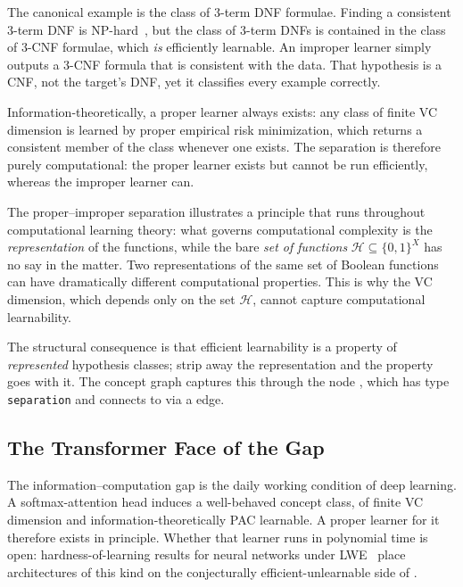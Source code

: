 The canonical example is the class of $3$-term DNF formulae.  Finding a
consistent $3$-term DNF is $\mathrm{NP}$-hard~\cite{PittValiant1988}, but the
class of $3$-term DNFs is contained in the class of $3$-CNF formulae, which
\emph{is} efficiently learnable.  An improper learner simply outputs a $3$-CNF
formula that is consistent with the data.  That hypothesis is a CNF, not the
target's DNF, yet it classifies every example correctly.

Information-theoretically, a proper learner always exists: any class of finite
VC dimension is learned by proper empirical risk minimization, which returns a
consistent member of the class whenever one
exists.
The separation is therefore purely computational: the proper learner exists
but cannot be run efficiently, whereas the improper learner can.

\begin{remark}
\label{rmk:representation}
The proper--improper separation illustrates a principle that runs throughout
computational learning theory: what governs computational complexity is the
\emph{representation} of the functions, while the bare \emph{set of functions}
$\mathcal{H} \subseteq \{0,1\}^X$ has no say in the matter.  Two representations of the same set
of Boolean functions can have dramatically different computational properties.
This is why the VC dimension, which depends only on the set
$\mathcal{H}$, cannot capture computational learnability.
\end{remark}

The structural consequence is that efficient learnability is a property of
\emph{represented} hypothesis classes; strip away the representation and the
property goes with it.  The
concept graph captures this through the node ,
which has type \texttt{separation} and connects to
 via a  edge.


\subsection{The Transformer Face of the Gap}
\label{sec:attention-gap}

The information--computation gap is the daily working condition of deep
learning.  A softmax-attention head induces a well-behaved concept class, of
finite VC dimension and information-theoretically PAC
learnable. A proper learner for
it therefore exists in principle.  Whether that learner runs in polynomial
time is open: hardness-of-learning results
for neural networks under LWE~\cite{Daniely2021} place architectures of this
kind on the conjecturally efficient-unlearnable side of
.

